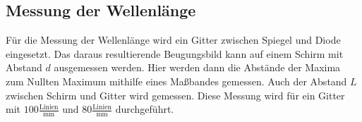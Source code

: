 \subsection*{Messung der Wellenlänge}
Für die Messung der Wellenlänge wird ein Gitter zwischen Spiegel und Diode eingesetzt.
Das daraus resultierende Beugungsbild kann auf einem Schirm mit Abstand $d$ ausgemessen werden.
Hier werden dann die Abstände der Maxima zum Nullten Maximum mithilfe eines Maßbandes gemessen.
Auch der Abstand $L$ zwischen Schirm und Gitter wird gemessen.
Diese Messung wird für ein Gitter mit $100 \frac{\text{Linien}}{\unit{\milli\meter}}$ und $80 \frac{\text{Linien}}{\unit{\milli\meter}}$ durchgeführt.